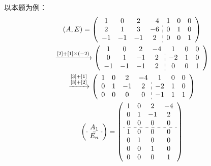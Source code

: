 \begin{solution}
\begin{enumerate}
              以本题为例：
              \begin{gather*}
                  (A, E) =
                  \left(\begin{array}{cccc:cccc}
                          1  & 0  & 2  & -4 & 1 & 0 & 0 \\
                          2  & 1  & 3  & -6 & 0 & 1 & 0 \\
                          -1 & -1 & -1 & 2  & 0 & 0 & 1
                      \end{array}\right) \\
                  \xrightarrow{[2] + [1] \times (-2)}
                  \left(\begin{array}{cccc:cccc}
                          1  & 0  & 2  & -4 & 1  & 0 & 0 \\
                          0  & 1  & -1 & 2  & -2 & 1 & 0 \\
                          -1 & -1 & -1 & 2  & 0  & 0 & 1
                      \end{array}\right) \\
                  \xrightarrow{\substack{[3] + [1] \\ [3] + [2]}}
                  \left(\begin{array}{cccc:cccc}
                          1 & 0 & 2  & -4 & 1  & 0 & 0 \\
                          0 & 1 & -1 & 2  & -2 & 1 & 0 \\
                          0 & 0 & 0  & 0  & -1 & 1 & 1
                      \end{array}\right) \\
                  \left(\begin{array}{c}
                      A_1 \\ \hdashline E_n
                  \end{array}\right) =
                  \left(\begin{array}{cccc}
                      1 & 0 & 2  & -4 \\
                      0 & 1 & -1 & 2  \\
                      0 & 0 & 0  & 0  \\ \hdashline
                      1 & 0 & 0  & 0  \\
                      0 & 1 & 0  & 0  \\
                      0 & 0 & 1  & 0  \\
                      0 & 0 & 0  & 1
                  \end{array}\right)

\end{gather*}
\end{enumerate}
\end{solution}
